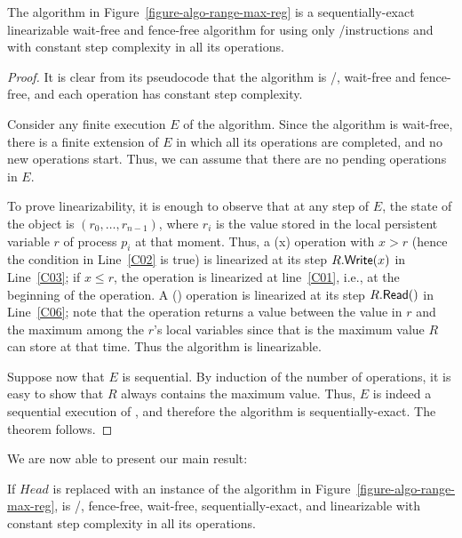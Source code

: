 \begin{theorem}\label{theo-range-max-reg}
  The algorithm in Figure~\ref{figure-algo-range-max-reg} is a sequentially-exact linearizable wait-free and fence-free algorithm for \RangeMaxReg using only \R/\W instructions and with constant step complexity in all its operations.
\end{theorem}

\begin{proof}
It is clear from its pseudocode that the algorithm is \R/\W, wait-free and fence-free, and each operation has constant step complexity.

Consider any finite execution \(E\) of the algorithm.  Since the algorithm is wait-free, there is a finite extension of \(E\) in which all its operations are completed, and no new operations start. Thus, we can assume that there are no pending operations in \(E\).

To prove linearizability, it is enough to observe that at any step of \(E\), the state of the object is \((r_0, \hdots, r_{n-1})\), where \(r_i\) is the value stored in the local persistent variable \(r\) of process \(p_i\) at that moment.  Thus, a \RMaxW(x) operation with \(x > r\) (hence the condition in Line~\ref{C02} is {\sf \small true}) is linearized at its step \(R.{\sf \small Write}(x)\) in Line~\ref{C03}; if \(x \leq r\), the operation is linearized at line~\ref{C01}, i.e., at the beginning of the operation.  A \RMaxR() operation is linearized at its step \(R.{\sf \small Read}()\) in Line~\ref{C06}; note that the operation returns a value between the value in \(r\) and the maximum among the \(r\)'s local variables since that is the maximum value \(R\) can store at that time. Thus the algorithm is linearizable.

Suppose now that \(E\) is sequential. By induction of the number of operations, it is easy to show that \(R\) always contains the maximum value.  Thus, \(E\) is indeed a sequential execution of \MaxReg, and therefore the algorithm is sequentially-exact. The theorem follows.
\end{proof}

We are now able to present our main result:

\begin{theorem}\label{theo-wf-fully}
If \(Head\) is replaced with an instance of the algorithm in Figure~\ref{figure-algo-range-max-reg}, \NCWSM is \R/\W, fence-free, wait-free, sequentially-exact, and linearizable with constant step complexity in all its operations.
\end{theorem}

